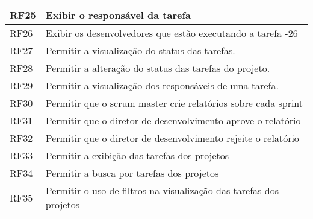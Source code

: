 \begin{table}[H]
\begin{tabular}{|l|l|}
RF25 & Exibir o responsável da tarefa                                                                                                                        \\ \hline
RF26 & Exibir os desenvolvedores que estão executando a tarefa -26                                                                                           \\ \hline
RF27 & Permitir a visualização do status das tarefas.                                                                                                        \\ \hline
RF28 & Permitir a alteração do status das tarefas do projeto.                                                                                                \\ \hline
RF29 & Permitir a visualização dos responsáveis de uma tarefa.                                                                                               \\ \hline
RF30 & Permitir que o scrum master crie relatórios sobre cada sprint                                                                                         \\ \hline
RF31 & Permitir que o diretor de desenvolvimento aprove o relatório                                                                                          \\ \hline
RF32 & Permitir que o diretor de desenvolvimento rejeite o relatório                                                                                         \\ \hline
RF33 & Permitir a exibição das tarefas dos projetos                                                                                                          \\ \hline
RF34 & Permitir a busca por tarefas dos projetos                                                                                                             \\ \hline
RF35 & Permitir o uso de filtros na visualização das tarefas dos projetos                                                                                    \\ \hline
\end{tabular}
\end{table}
